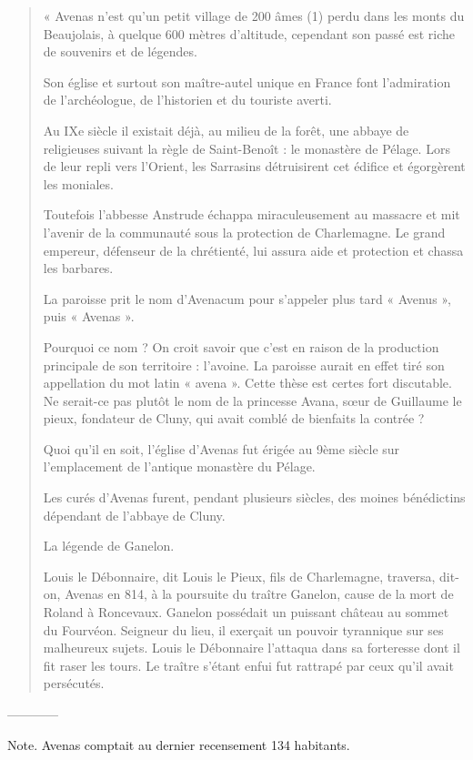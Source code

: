 \begin{quote}
« Avenas n'est qu'un petit village de 200 âmes (1) perdu dans les monts du Beaujolais, à quelque 600 mètres d'altitude, cependant son passé est riche de souvenirs et de légendes.

Son église et surtout son maître-autel unique en France font l'admiration de l'archéologue, de l'historien et du touriste averti.

Au IXe siècle il existait déjà, au milieu de la forêt, une abbaye de religieuses suivant la règle de Saint-Benoît : le monastère de Pélage. Lors de leur repli vers l'Orient, les Sarrasins détruisirent cet édifice et égorgèrent les moniales.

Toutefois l'abbesse Anstrude échappa miraculeusement au massacre et mit l'avenir de la communauté sous la protection de Charlemagne. Le grand empereur, défenseur de la chrétienté, lui assura aide et protection et chassa les barbares.

La paroisse prit le nom d'Avenacum pour s'appeler plus tard « Avenus », puis « Avenas ».

Pourquoi ce nom ? On croit savoir que c'est en raison de la production principale de son territoire : l'avoine. La paroisse aurait en effet tiré son appellation du mot latin « avena ». Cette thèse est certes fort discutable. Ne serait-ce pas plutôt le nom de la princesse Avana, sœur de Guillaume le pieux, fondateur de Cluny, qui avait comblé de bienfaits la contrée ?

Quoi qu'il en soit, l'église d'Avenas fut érigée au 9ème siècle sur l'emplacement de l'antique monastère du Pélage.

Les curés d'Avenas furent, pendant plusieurs siècles, des moines bénédictins dépendant de l'abbaye de Cluny.

La légende de Ganelon.

Louis le Débonnaire, dit Louis le Pieux, fils de Charlemagne, traversa, dit-on, Avenas en 814, à la poursuite du traître Ganelon, cause de la mort de Roland à Roncevaux. Ganelon possédait un puissant château au sommet du Fourvéon. Seigneur du lieu, il exerçait un pouvoir tyrannique sur ses malheureux sujets. Louis le Débonnaire l'attaqua dans sa forteresse dont il fit raser les tours. Le traître s'étant enfui fut rattrapé par ceux qu'il avait persécutés.

\end{quote}
------------

Note. Avenas comptait au dernier recensement 134 habitants.

